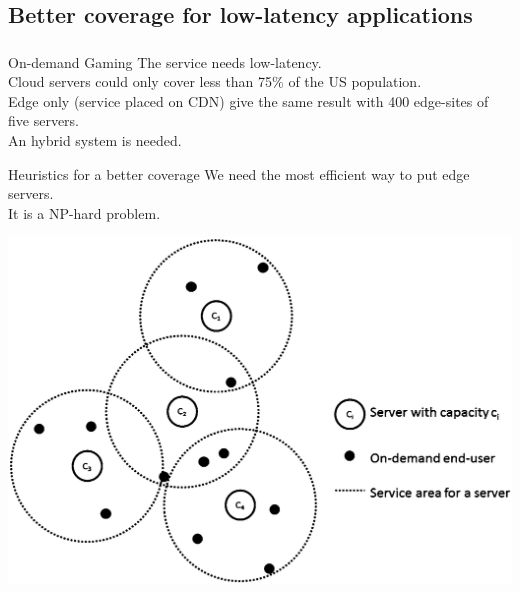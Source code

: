 \documentclass[utf8,xcolor=table, page number]{earlywinter}
\begin{document}
\subsection{Better coverage for low-latency applications}
\begin{frame}
  \frametitle{\secname}
  \framesubtitle{\subsecname}

  \begin{exampleblock}{On-demand Gaming}
    The service needs low-latency.\\
    Cloud servers could only cover less than 75\% of the US population.\\
    Edge only (service placed on CDN) give the same result with 400 edge-sites of five servers.\\
    An hybrid system is needed.
  \end{exampleblock}

  \begin{minipage}[l]{0.45\linewidth}
    \begin{alertblock}{Heuristics for a better coverage}
      We need the most efficient way to put edge servers.\\
      It is a NP-hard problem.
    \end{alertblock}
  \end{minipage}
  \begin{minipage}[l]{0.5\linewidth}
  \begin{center}
  \includegraphics[width=\linewidth]{coverage}
  \end{center}
  \end{minipage}
  
\end{frame}
\end{document}
